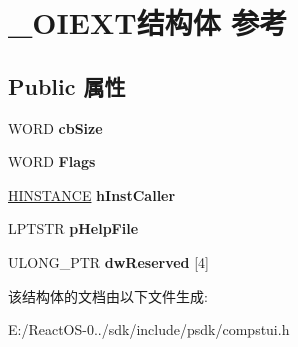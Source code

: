 \hypertarget{struct___o_i_e_x_t}{}\section{\+\_\+\+O\+I\+E\+X\+T结构体 参考}
\label{struct___o_i_e_x_t}
\subsection*{Public 属性}
\begin{DoxyCompactItemize}
\item 
\mbox{\label{struct___o_i_e_x_t_accccf3d5df65d4e0333c6af9df878856}} 
W\+O\+RD {\bfseries cb\+Size}
\item 
\mbox{\label{struct___o_i_e_x_t_a83767b121314a0c1c54710c95016858b}} 
W\+O\+RD {\bfseries Flags}
\item 
\mbox{\label{struct___o_i_e_x_t_a0b2608fc3d84675bcdae5dc380b0d64a}} 
\hyperlink{interfacevoid}{H\+I\+N\+S\+T\+A\+N\+CE} {\bfseries h\+Inst\+Caller}
\item 
\mbox{\label{struct___o_i_e_x_t_a0f254ff5f673da10424e1ad792dec993}} 
L\+P\+T\+S\+TR {\bfseries p\+Help\+File}
\item 
\mbox{\label{struct___o_i_e_x_t_a4e1614d0014f2bcddf126487cd8aa68d}} 
U\+L\+O\+N\+G\+\_\+\+P\+TR {\bfseries dw\+Reserved} \mbox{[}4\mbox{]}
\end{DoxyCompactItemize}


该结构体的文档由以下文件生成\+:\begin{DoxyCompactItemize}
\item 
E\+:/\+React\+O\+S-\/0../sdk/include/psdk/compstui.\+h\end{DoxyCompactItemize}
